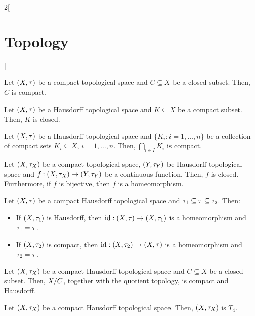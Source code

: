 \documentclass[../../../main.tex]{subfiles}
\begin{document}
\begin{multicols}{2}[\section{Topology}]
\begin{theorem}
  \end{theorem}
  \begin{theorem}
    Let $(X,\tau)$ be a compact topological space and $C\subseteq X$ be a closed subset. Then, $C$ is compact.
  \end{theorem}
  \begin{theorem}
    Let $(X,\tau)$ be a Hausdorff topological space and $K\subseteq X$ be a compact subset. Then, $K$ is closed.
  \end{theorem}
  \begin{corollary}
    Let $(X,\tau)$ be a Hausdorff topological space and $\{K_i:i=1,\ldots,n\}$ be a collection of compact sets $K_i\subseteq X$, $i=1,\ldots,n$. Then, $\bigcap_{i\in I}K_i$ is compact.
  \end{corollary}
  \begin{corollary}
    Let $(X,\tau_X)$ be a compact topological space, $(Y,\tau_Y)$ be Hausdorff topological space and $f:(X,\tau_X)\rightarrow(Y,\tau_Y)$ be a continuous function. Then, $f$ is closed. Furthermore, if $f$ is bijective, then $f$ is a homeomorphism.
  \end{corollary}
  \begin{corollary}
    Let $(X,\tau)$ be a compact Hausdorff topological space and $\tau_1\subseteq\tau\subseteq\tau_2$. Then:
    \begin{itemize}
      \item If $(X,\tau_1)$ is Hausdorff, then $\mathrm{id}:(X,\tau)\rightarrow(X,\tau_1)$ is a homeomorphism and $\tau_1=\tau$.
      \item If $(X,\tau_2)$ is compact, then $\mathrm{id}:(X,\tau_2)\rightarrow(X,\tau)$ is a homeomorphism and $\tau_2=\tau$.
    \end{itemize}
  \end{corollary}
  \begin{prop}
    Let $(X,\tau_X)$ be a compact Hausdorff topological space and $C\subseteq X$ be a closed subset. Then, $\quot{X}{C}$, together with the quotient topology, is compact and Hausdorff.
  \end{prop}
  \begin{prop}
    Let $(X,\tau_X)$ be a compact Hausdorff topological space. Then, $(X,\tau_X)$ is $T_4$.
  \end{prop}

\end{multicols}
\end{document}
